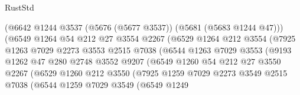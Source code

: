 \begin{lexlean}{RustStd}
\begin{coremodule}
                                (@6642 @1244 @3537 (@5676 (@5677 @3537)) (@5681 (@5683 @1244 @47)))
                                (@6549
                                  @1264
                                  @54
                                  @212
                                  @27
                                  @3554
                                  @2267
                                  (@6529
                                    @1264
                                    @212
                                    @3554
                                    (@7925
                                      @1263
                                      @7029
                                      @2273
                                      @3553
                                      @2515
                                      @7038
                                      (@6544
                                        @1263
                                        @7029
                                        @3553
                                        (@9193
                                          @1262
                                          @47
                                          @280
                                          @2748
                                          @3552
                                          @9207
                                          (@6549
                                            @1260
                                            @54
                                            @212
                                            @27
                                            @3550
                                            @2267
                                            (@6529
                                              @1260
                                              @212
                                              @3550
                                              (@7925
                                                @1259
                                                @7029
                                                @2273
                                                @3549
                                                @2515
                                                @7038
                                                (@6544
                                                  @1259
                                                  @7029
                                                  @3549
                                                  (@6549
                                                    @1249

\end{coremodule}
\end{lexlean}
